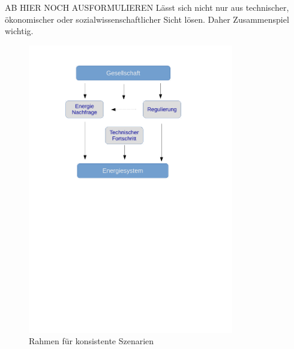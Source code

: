 \documentclass[a4paper,11pt,twoside]{scrartcl}
\begin{document}
AB HIER NOCH AUSFORMULIEREN
Lässt sich nicht nur aus technischer, ökonomischer oder sozialwissenschaftlicher Sicht lösen. Daher Zusammenspiel wichtig.

\begin{figure}[!h]
    \centering
    \includegraphics[width=0.8\textwidth]{figures/Szenarien.pdf}
    \caption{Rahmen für konsistente Szenarien}
    \label{fig:szenarien}
\end{figure}
\end{document}
